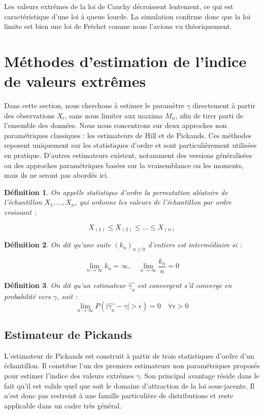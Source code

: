 \documentclass{article}
\theoremstyle{plain}
\newtheorem{definition}{Définition}[section]
\theoremstyle{definition}
\theoremstyle{plain}
\begin{document}
\noindent Les valeurs extrêmes de la loi de Cauchy décroissent lentement, ce qui est caractéristique d'une loi à queue lourde. La simulation confirme donc que la loi limite est bien une loi de Fréchet comme nous l'avions vu théoriquement.

\section{Méthodes d'estimation de l'indice de valeurs extrêmes}
\noindent Dans cette section, nous cherchons à estimer le paramètre \(\gamma\) directement à partir des observations \(X_i\), sans nous limiter aux maxima \(M_n\), afin de tirer parti de l’ensemble des données.  
Nous nous concentrons sur deux approches non paramétriques classiques : les estimateurs de Hill et de Pickands. Ces méthodes reposent uniquement sur les statistiques d’ordre et sont particulièrement utilisées en pratique. D'autres estimateurs existent, notamment des versions généralisées ou des approches paramétriques basées sur la vraisemblance ou les moments, mais ils ne seront pas abordés ici. \\

\begin{definition}
On appelle \textit{statistique d'ordre} la permutation aléatoire de l'échantillon \(X_1, \dots, X_n\), qui ordonne les valeurs de l’échantillon par ordre croissant :

\[
X_{(1)} \leq X_{(2)} \leq \dots \leq X_{(n)}
\]
\end{definition}

\begin{definition}
On dit qu'une suite \((k_n)_{n \geq 0}\) d'entiers est intermédiaire si :

\[
\lim_{n \to \infty} k_n = \infty, \quad \lim_{n \to \infty} \frac{k_n}{n} = 0
\]

\end{definition}


\begin{definition}
On dit qu'un estimateur \(\hat{\gamma_{n}}\) est convergent s'il converge en probabilité vers \(\gamma\), soit :
\[
\lim_{n \to \infty} P(\lvert \hat{\gamma_{n}} - \gamma \rvert > \epsilon) = 0 \quad \forall \epsilon > 0
\]  
\end{definition}

\subsection{Estimateur de Pickands}
L’estimateur de Pickands est construit à partir de trois statistiques d’ordre d'un échantillon. Il constitue l’un des premiers estimateurs non paramétriques proposés pour estimer l’indice des valeurs extrêmes \(\gamma\). Son principal avantage réside dans le fait qu’il est valide quel que soit le domaine d’attraction de la loi sous-jacente. Il n'est donc pas restreint à une famille particulière de distributions et reste applicable dans un cadre très général.
\end{document}
